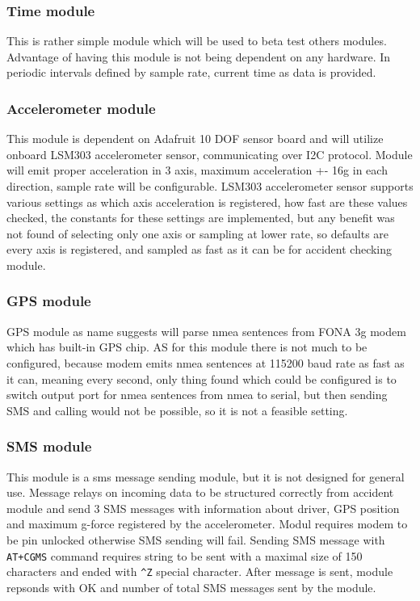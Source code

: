 \subsubsection{Time module} %
\label{ssub:time_module}
This is rather simple module which will be used to beta test others modules. Advantage of having this module is not being dependent on any hardware. In periodic intervals defined by sample rate, current time as data is provided.
\subsubsection{Accelerometer module} %
This module is dependent on Adafruit 10 DOF sensor board and will utilize onboard LSM303 accelerometer sensor, communicating over I2C protocol. Module will emit proper acceleration in 3 axis, maximum acceleration +- 16g in each direction, sample rate will be configurable. LSM303 accelerometer sensor supports various settings as which axis acceleration is registered, how fast are these values checked, the constants for these settings are implemented, but any benefit was not found of selecting only one axis or sampling at lower rate, so defaults are every axis is registered, and sampled as fast as it can be for accident checking module.
\label{ssub:accelerometer_module}
\subsubsection{GPS module} %
\label{ssub:gps_module}
GPS module as name suggests will parse nmea sentences from FONA 3g modem which has built-in GPS chip. AS for this module there is not much to be configured, because modem emits nmea sentences at 115200 baud rate as fast as it can, meaning every second, only thing found which could be configured is to switch output port for nmea sentences from nmea to serial, but then sending SMS and calling would not be possible, so it is not a feasible setting.
\subsubsection{SMS module} %
\label{ssub:sms_module}
This module is a sms message sending module, but it is not designed for general use. Message relays on incoming data to be structured correctly from accident module and send 3 SMS messages with information about driver, GPS position and maximum g-force registered by the accelerometer. Modul requires modem to be pin unlocked otherwise SMS sending will fail. Sending SMS message with \verb|AT+CGMS| command requires string to be sent with a maximal size of 150 characters and ended with \verb|^Z| special character. After message is sent, module repsonds with OK and number of total SMS messages sent by the module.
